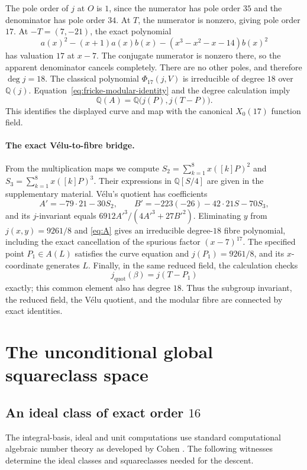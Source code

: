 \documentclass[11pt,a4paper]{article}
\theoremstyle{definition}\newtheorem{definition}[theorem]{Definition}
\theoremstyle{remark}\newtheorem{remark}[theorem]{Remark}
\newcommand{\Q}{\mathbb Q}\newcommand{\Z}{\mathbb Z}\newcommand{\F}{\mathbb F}
\begin{document}
The pole order of $j$ at $O$ is $1$, since the numerator has pole order
$35$ and the denominator has pole order $34$. At $T$, the numerator is
nonzero, giving pole order $17$. At $-T=(7,-21)$, the exact polynomial
\[
a(x)^2-(x+1)a(x)b(x)-(x^3-x^2-x-14)b(x)^2
\]
has valuation $17$ at $x-7$. The conjugate numerator is nonzero there,
so the apparent denominator cancels completely. There are no other
poles, and therefore $\deg j=18$.
The classical polynomial $\Phi_{17}(j,V)$ is irreducible of degree
$18$ over $\Q(j)$. Equation~\eqref{eq:fricke-modular-identity} and the
degree calculation imply
\[
\Q(A)=\Q\bigl(j(P),j(T-P)\bigr).
\]
This identifies the displayed curve and map with the canonical
$X_0(17)$ function field. 

\paragraph{The exact V\'elu-to-fibre bridge.}
From the multiplication maps we compute
$S_2=\sum_{k=1}^{8}x([k]P)^2$ and
$S_3=\sum_{k=1}^{8}x([k]P)^3$. Their expressions in $\Q[S/4]$ are given in the supplementary material. V\'elu's quotient has coefficients
\[
A'=-79\cdot21-30S_2,\qquad
B'=-223(-26)-42\cdot21S-70S_3,
\]
and its $j$-invariant equals
$6912A'^3/(4A'^3+27B'^2)$.
Eliminating $y$ from $j(x,y)=9261/8$ and \eqref{eq:A} gives an irreducible degree-$18$ fibre polynomial,
including the exact cancellation of the spurious factor
$(x-7)^{17}$. The specified point $P_1\in A(L)$ satisfies the curve
equation and $j(P_1)=9261/8$, and its $x$-coordinate generates $L$.
Finally, in the same reduced field, the calculation checks
\[
j_{\mathrm{quot}}(\beta)=j(T-P_1)
\]
exactly; this common element also has degree $18$.
Thus the subgroup invariant, the reduced field, the V\'elu quotient,
and the modular fibre are connected by exact identities.



\section{The unconditional global squareclass space}\label{sec:global}

\subsection{An ideal class of exact order $16$}

The integral-basis, ideal and unit computations use standard computational algebraic number theory as developed by Cohen \cite{Cohen1993,Cohen2000}. The following witnesses determine the ideal classes and squareclasses needed for the descent.
\end{document}
